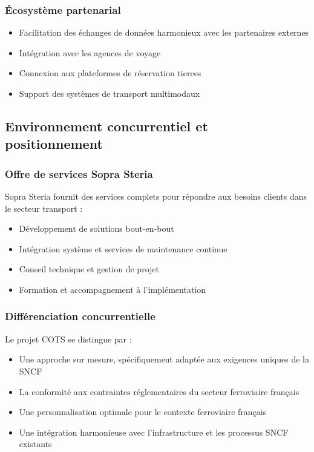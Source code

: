 \subsubsection{Écosystème partenarial}
\begin{itemize}
    \item Facilitation des échanges de données harmonieux avec les partenaires externes
    \item Intégration avec les agences de voyage
    \item Connexion aux plateformes de réservation tierces
    \item Support des systèmes de transport multimodaux
\end{itemize}

\subsection{Environnement concurrentiel et positionnement}

\subsubsection{Offre de services Sopra Steria}

Sopra Steria fournit des services complets pour répondre aux besoins clients dans le secteur transport :
\begin{itemize}
    \item Développement de solutions bout-en-bout
    \item Intégration système et services de maintenance continue
    \item Conseil technique et gestion de projet
    \item Formation et accompagnement à l'implémentation
\end{itemize}

\subsubsection{Différenciation concurrentielle}

Le projet COTS se distingue par :
\begin{itemize}
    \item Une approche sur mesure, spécifiquement adaptée aux exigences uniques de la SNCF
    \item La conformité aux contraintes réglementaires du secteur ferroviaire français
    \item Une personnalisation optimale pour le contexte ferroviaire français
    \item Une intégration harmonieuse avec l'infrastructure et les processus SNCF existants
\end{itemize}

